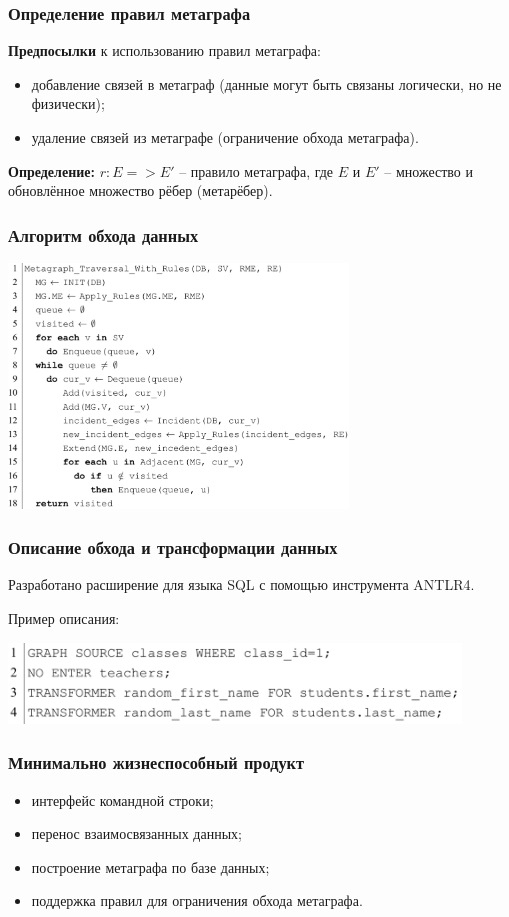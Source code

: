 \documentclass[pdf, hyperref={unicode}, aspectratio=169]{beamer}
\begin{document}
\begin{frame}
\frametitle{Определение правил метаграфа}
	\textbf{Предпосылки} к использованию правил метаграфа:
	\begin{itemize}
		\item добавление связей в метаграф (данные могут быть связаны логически, но не физически);
		\item удаление связей из метаграфе (ограничение обхода метаграфа).
	\end{itemize}

	\textbf{Определение:} $r: E => E'$ -- правило метаграфа, где $E$ и $E'$ -- множество и обновлённое множество рёбер (метарёбер).
\end{frame}


\begin{frame}
\frametitle{Алгоритм обхода данных}
	\begin{center}
		\includegraphics[height = 6.5cm]{img/algorithm-with-rules}
	\end{center}
\end{frame}


\begin{frame}
\frametitle{Описание обхода и трансформации данных}
	Разработано расширение для языка SQL с помощью инструмента ANTLR4.

	Пример описания:
	\begin{center}
		\includegraphics[width = 12cm]{img/language-1}
	\end{center}
\end{frame}


\begin{frame}
\frametitle{Минимально жизнеспособный продукт}
	\begin{itemize}
		\item интерфейс командной строки;
		\item перенос взаимосвязанных данных;
		\item построение метаграфа по базе данных;
		\item поддержка правил для ограничения обхода метаграфа.
	\end{itemize}
\end{frame}
\end{document}
